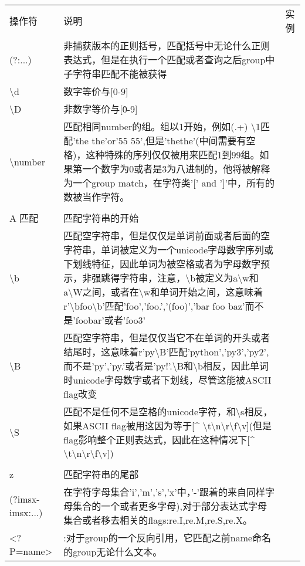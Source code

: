 \documentclass{book}
\begin{document}
\begin{center}
\begin{tabular}{|p{2.5cm}|p{8cm}|p{4cm}|}
操作符 & 说明 & 实例\\
(?:...)&非捕获版本的正则括号，匹配括号中无论什么正则表达式，但是在执行一个匹配或者查询之后group中子字符串匹配不能被获得&\\
\hline
\textbackslash d&数字等价与[0-9]&\\
\hline
\textbackslash D&非数字等价与[\^0-9]&\\
\hline
\textbackslash number &匹配相同number的组。组以1开始，例如(.+) \textbackslash1匹配'the the'or'55 55',但是'thethe'(中间需要有空格)，这种特殊的序列仅仅被用来匹配1到99组。如果第一个数字为0或者是3为八进制的，他将被解释为一个group match，在字符类'[' and ']'中，所有的数被当作字符。&\\
\hline
\\A 匹配&匹配字符串的开始\\
\hline
\textbackslash b& 匹配空字符串，但是仅仅是单词前面或者后面的空字符串，单词被定义为一个unicode字母数字序列或下划线特征，因此单词为被空格或者为字母数字预示，非强跳得字符串，注意，\textbackslash b被定义为a\textbackslash w和a\textbackslash W之间，或者在\textbackslash w和单词开始之间，这意味着r'\textbackslash bfoo\textbackslash b'匹配'foo','foo.','(foo)','bar foo baz'而不是'foobar'或者'foo3'&\\
\hline
\textbackslash B &匹配空字符串，但是仅仅当它不在单词的开头或者结尾时，这意味着r'py\textbackslash B'匹配'python','py3','py2',而不是'py','py.'或者是'py!'.\textbackslash B和\textbackslash b相反，因此单词时unicode字母数字或者下划线，尽管这能被ASCII flag改变&\\
\hline
\hline
\textbackslash S&匹配不是任何不是空格的unicode字符，和\textbackslash s相反，如果ASCII flag被用这因为等于[\^{} \textbackslash t\textbackslash n\textbackslash r\textbackslash f\textbackslash v](但是flag影响整个正则表达式，因此在这种情况下[\^{} \textbackslash t\textbackslash n\textbackslash r\textbackslash f\textbackslash v])&\\
\hline
\\z&匹配字符串的尾部&\\
\hline
(?imsx-imsx:...)&在字符字母集合'i','m','s','x'中，'-'跟着的来自同样字母集合的一个或者更多字母),对于部分表达式字母集合或者移去相关的flags:re.I,re.M,re.S,re.X。\\
\hline
<?P=name>&:对于group的一个反向引用，它匹配之前name命名的group无论什么文本。\\
\hline
\end{tabular}
\end{center}
\end{document}
